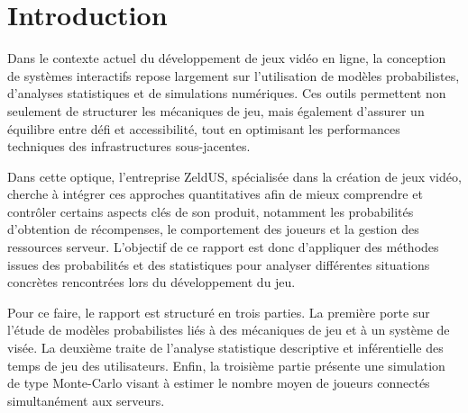    \section*{Introduction}\label{introduction}

Dans le contexte actuel du développement de jeux vidéo en ligne, la
conception de systèmes interactifs repose largement sur l'utilisation de
modèles probabilistes, d'analyses statistiques et de simulations
numériques. Ces outils permettent non seulement de structurer les
mécaniques de jeu, mais également d'assurer un équilibre entre défi et
accessibilité, tout en optimisant les performances techniques des
infrastructures sous-jacentes.

Dans cette optique, l'entreprise ZeldUS, spécialisée dans la création de
jeux vidéo, cherche à intégrer ces approches quantitatives afin de mieux
comprendre et contrôler certains aspects clés de son produit, notamment
les probabilités d'obtention de récompenses, le comportement des joueurs
et la gestion des ressources serveur. L'objectif de ce rapport est donc
d'appliquer des méthodes issues des probabilités et des statistiques
pour analyser différentes situations concrètes rencontrées lors du
développement du jeu.

Pour ce faire, le rapport est structuré en trois parties. La première
porte sur l'étude de modèles probabilistes liés à des mécaniques de jeu
et à un système de visée. La deuxième traite de l'analyse statistique
descriptive et inférentielle des temps de jeu des utilisateurs. Enfin,
la troisième partie présente une simulation de type Monte-Carlo visant à
estimer le nombre moyen de joueurs connectés simultanément aux serveurs.
